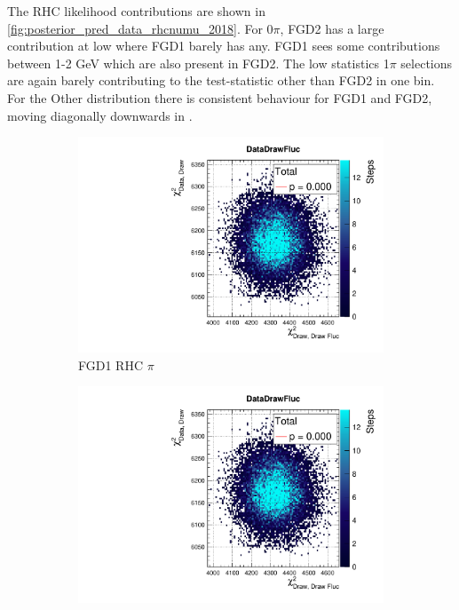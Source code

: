The \numu RHC likelihood contributions are shown in \autoref{fig:posterior_pred_data_rhcnumu_2018}. For 0$\pi$, FGD2 has a large contribution at low \pmu where FGD1 barely has any. FGD1 sees some contributions between 1-2 GeV which are also present in FGD2. The low statistics 1$\pi$ selections are again barely contributing to the test-statistic other than FGD2 in one bin. For the Other distribution there is consistent behaviour for FGD1 and FGD2, moving diagonally downwards in \pmu \cosmu.
\begin{figure}[h]
	\begin{subfigure}[t]{0.32\textwidth}
		\includegraphics[width=\textwidth, trim={20mm 6mm 4mm 11mm}, clip,page=115]{figures/mach3/2018/data/2018a_FixedCov_RedCov_Mpi_Data_merge_PostPredStore_FullLLH_procs}
		\caption{FGD1 RHC $\pi$}
	\end{subfigure}
	\begin{subfigure}[t]{0.32\textwidth}
		\includegraphics[width=\textwidth, trim={20mm 6mm 4mm 11mm}, clip,page=124]{figures/mach3/2018/data/2018a_FixedCov_RedCov_Mpi_Data_merge_PostPredStore_FullLLH_procs}

\end{subfigure}
\end{figure}

